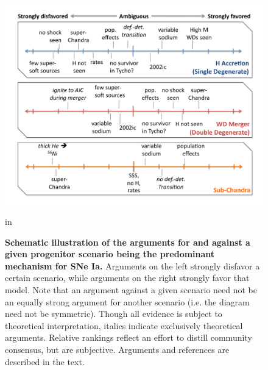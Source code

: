 \documentclass{nature1}
\begin{document}
\begin{figure}
\includegraphics[width=7in]{evidence.pdf} 
\caption{\textsf{{\bf \textsf{Schematic illustration of the arguments for and against a
  given progenitor scenario being the predominant mechanism for SNe
  Ia.}}  Arguments on the left strongly disfavor a certain scenario,
  while arguments on the right strongly favor that model.  Note
  that an argument against a given scenario need not be an equally
  strong argument for another scenario (i.e. the diagram need not be
  symmetric).  Though all evidence is subject to theoretical
  interpretation, italics indicate exclusively theoretical arguments.
  Relative rankings reflect an effort to distill community consensus,
  but are subjective.  Arguments and references are described in the text.
}}
\label{evidence}
 in
\end{figure}
\end{document}
